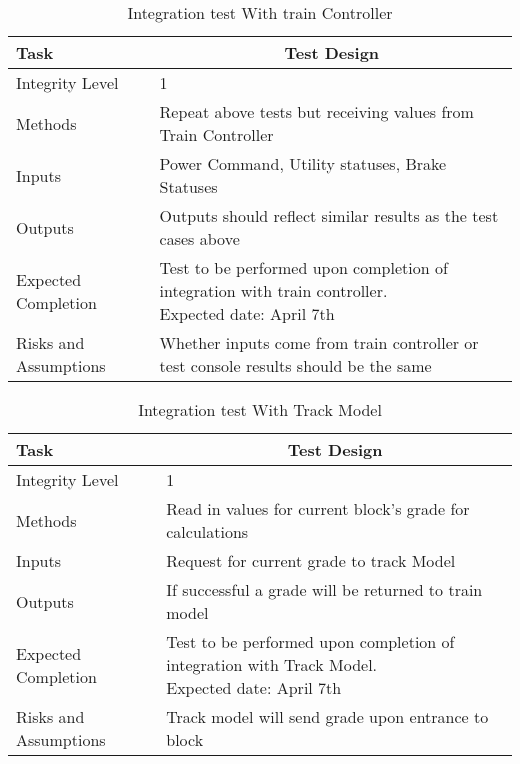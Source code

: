 \documentclass[]{article}
\begin{document}
	\begin{table}[H]
		\centering
		\caption{Integration test With train Controller}
		\begin{tabular}{|l|l|}
			\hline
			Task & \multicolumn{1}{c|}{Test Design} \\ \hline
			Integrity Level & 1 \\ \hline
			Methods & Repeat above tests but receiving values from Train Controller \\ \hline
			Inputs &  Power Command, Utility statuses, Brake Statuses\\ \hline
			Outputs & Outputs should reflect similar results as the test cases above \\ \hline
			Expected Completion & \parbox[t]{10cm}{Test to be performed upon completion of integration with train controller.\\ Expected date: April 7th}\\ \hline
			Risks and Assumptions & \parbox[t]{10cm}{Whether inputs come from train controller or test console results should be the same}\\ \hline
		\end{tabular}
	\end{table}

	\begin{table}[H]
		\centering
		\caption{Integration test With Track Model}
		\begin{tabular}{|l|l|}
			\hline
			Task & \multicolumn{1}{c|}{Test Design} \\ \hline
			Integrity Level & 1 \\ \hline
			Methods & Read in values for current block's grade for calculations \\ \hline
			Inputs & Request for current grade to track Model\\ \hline
			Outputs & If successful a grade will be returned to train model \\ \hline
			Expected Completion & \parbox[t]{10cm}{Test to be performed upon completion of integration with Track Model.\\ Expected date: April 7th}\\ \hline
			Risks and Assumptions & Track model will send grade upon entrance to block\\ \hline
		\end{tabular}
	\end{table}
\end{document}
